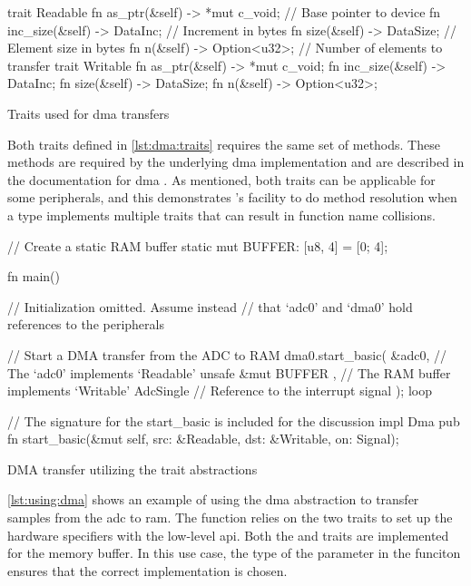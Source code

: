 \begin{listing}[H]
  \begin{rustcode}
trait Readable {
  fn as_ptr(&self) -> *mut c_void; // Base pointer to device
  fn inc_size(&self) -> DataInc;   // Increment in bytes
  fn size(&self) -> DataSize;      // Element size in bytes
  fn n(&self) -> Option<u32>;      // Number of elements to transfer
}
trait Writable {
  fn as_ptr(&self) -> *mut c_void;
  fn inc_size(&self) -> DataInc;
  fn size(&self) -> DataSize;
  fn n(&self) -> Option<u32>;
}
  \end{rustcode}
  \caption{Traits used for \gls{dma} transfers}
  \label{lst:dma:traits}
\end{listing}

Both traits defined in \autoref{lst:dma:traits} requires the same set of methods.
These methods are required by the underlying \gls{dma} implementation and are described in the {\emlib} documentation for \gls{dma} \cite{Dma2004}.
As mentioned, both traits can be applicable for some peripherals, and this demonstrates {\rust}'s facility to do method resolution when a type implements multiple traits that can result in function name collisions.

\begin{listing}[H]
  \begin{rustcode}
// Create a static RAM buffer
static mut BUFFER: [u8, 4] = [0; 4];

fn main() {
  // Initialization omitted. Assume instead
  // that `adc0' and `dma0' hold references to the peripherals

  // Start a DMA transfer from the ADC to RAM
  dma0.start_basic(
    &adc0,                  // The `adc0' implements `Readable'
    unsafe { &mut BUFFER }, // The RAM buffer implements `Writable'
    AdcSingle               // Reference to the interrupt signal
  );
  loop {}
}

// The signature for the start_basic is included for the discussion
impl Dma {
  pub fn start_basic(&mut self,
                     src: &Readable, dst: &Writable, on: Signal);
}
  \end{rustcode}
  \caption{DMA transfer utilizing the trait abstractions}
  \label{lst:using:dma}
\end{listing}

\autoref{lst:using:dma} shows an example of using the \gls{dma} abstraction to transfer samples from the \gls{adc} to \gls{ram}.
The  function relies on the two traits to set up the hardware specifiers with the low-level \gls{api}.
Both the  and  traits are implemented for the memory buffer.
In this use case, the type of the  parameter in the  funciton ensures that the correct implementation is chosen.

